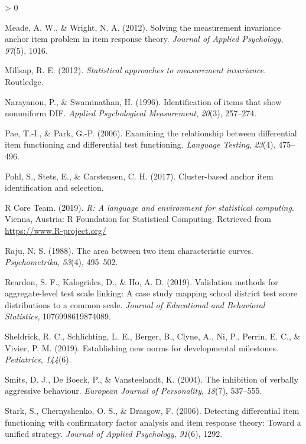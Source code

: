 \documentclass[
  english,
  man,floatsintext]{apa6}
\newlength{\cslhangindent}
\newenvironment{CSLReferences}[2] %
 {%
  \setlength{\parindent}{0pt}
  \ifodd #1 \everypar{\setlength{\hangindent}{\cslhangindent}}\ignorespaces\fi
  \ifnum #2 > 0
  \setlength{\parskip}{#2\baselineskip}
  \fi
 }%
 {}
\begin{document}
\begin{CSLReferences}{1}{0}
\leavevmode\hypertarget{ref-meade2012solving}{}%
Meade, A. W., \& Wright, N. A. (2012). Solving the measurement invariance anchor item problem in item response theory. \emph{Journal of Applied Psychology}, \emph{97}(5), 1016.

\leavevmode\hypertarget{ref-millsap2012statistical}{}%
Millsap, R. E. (2012). \emph{Statistical approaches to measurement invariance}. Routledge.

\leavevmode\hypertarget{ref-narayanon1996identification}{}%
Narayanon, P., \& Swaminathan, H. (1996). Identification of items that show nonuniform DIF. \emph{Applied Psychological Measurement}, \emph{20}(3), 257--274.

\leavevmode\hypertarget{ref-pae2006examining}{}%
Pae, T.-I., \& Park, G.-P. (2006). Examining the relationship between differential item functioning and differential test functioning. \emph{Language Testing}, \emph{23}(4), 475--496.

\leavevmode\hypertarget{ref-pohl2017cluster}{}%
Pohl, S., Stets, E., \& Carstensen, C. H. (2017). Cluster-based anchor item identification and selection.

\leavevmode\hypertarget{ref-rcore}{}%
R Core Team. (2019). \emph{R: A language and environment for statistical computing}. Vienna, Austria: R Foundation for Statistical Computing. Retrieved from \url{https://www.R-project.org/}

\leavevmode\hypertarget{ref-raju1988area}{}%
Raju, N. S. (1988). The area between two item characteristic curves. \emph{Psychometrika}, \emph{53}(4), 495--502.

\leavevmode\hypertarget{ref-reardon2019validation}{}%
Reardon, S. F., Kalogrides, D., \& Ho, A. D. (2019). Validation methods for aggregate-level test scale linking: A case study mapping school district test score distributions to a common scale. \emph{Journal of Educational and Behavioral Statistics}, 1076998619874089.

\leavevmode\hypertarget{ref-sheldrick2019establishing}{}%
Sheldrick, R. C., Schlichting, L. E., Berger, B., Clyne, A., Ni, P., Perrin, E. C., \& Vivier, P. M. (2019). Establishing new norms for developmental milestones. \emph{Pediatrics}, \emph{144}(6).

\leavevmode\hypertarget{ref-smits2004inhibition}{}%
Smits, D. J., De Boeck, P., \& Vansteelandt, K. (2004). The inhibition of verbally aggressive behaviour. \emph{European Journal of Personality}, \emph{18}(7), 537--555.

\leavevmode\hypertarget{ref-stark2006detecting}{}%
Stark, S., Chernyshenko, O. S., \& Drasgow, F. (2006). Detecting differential item functioning with confirmatory factor analysis and item response theory: Toward a unified strategy. \emph{Journal of Applied Psychology}, \emph{91}(6), 1292.


\end{CSLReferences}
\end{document}
